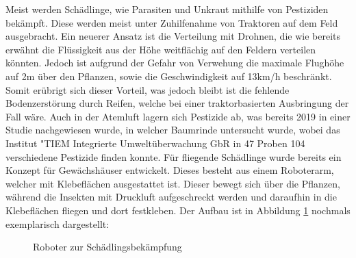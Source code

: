 Meist werden Schädlinge, wie Parasiten und Unkraut mithilfe von Pestiziden
bekämpft. Diese werden meist unter Zuhilfenahme von Traktoren auf dem Feld
ausgebracht. Ein neuerer Ansatz ist die Verteilung mit Drohnen, die wie bereits
erwähnt die Flüssigkeit aus der Höhe weitflächig auf den Feldern verteilen
könnten. Jedoch ist aufgrund der Gefahr von Verwehung die maximale Flughöhe auf
2m über den Pflanzen, sowie die Geschwindigkeit auf 13km/h
beschränkt.\cite{bvl} Somit erübrigt sich dieser Vorteil, was jedoch bleibt ist
die fehlende Bodenzerstörung durch Reifen, welche bei einer traktorbasierten
Ausbringung der Fall wäre. Auch in der Atemluft lagern sich Pestizide ab, was
bereits 2019 in einer Studie nachgewiesen wurde, in welcher Baumrinde
untersucht wurde, wobei das Institut "TIEM Integrierte Umweltüberwachung GbR in
47 Proben 104 verschiedene Pestizide finden
konnte.\cite{clausing2020baumrinden} Für fliegende Schädlinge wurde bereits ein
Konzept für Gewächshäuser entwickelt. Dieses besteht aus einem Roboterarm,
welcher mit Klebeflächen ausgestattet ist. Dieser bewegt sich über die
Pflanzen, während die Insekten mit Druckluft aufgeschreckt werden und daraufhin
in die Klebeflächen fliegen und dort festkleben. Der Aufbau ist in Abbildung
\ref{fig:schaedlingsbekaempfung} nochmals exemplarisch dargestellt:\cite{hoing2020entwicklung}

\begin{figure}[!h]
    \centering
    
    \caption{Roboter zur Schädlingsbekämpfung}
    \label{fig:schaedlingsbekaempfung}
\end{figure}

